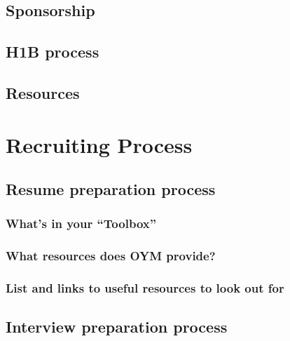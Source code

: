\documentclass[
]{book}
\begin{document}
\hypertarget{sponsorship}{%
\section{Sponsorship}\label{sponsorship}}

\hypertarget{h1b-process}{%
\section{H1B process}\label{h1b-process}}

\hypertarget{resources}{%
\section{Resources}\label{resources}}

\hypertarget{recruiting-process}{%
\chapter*{Recruiting Process}\label{recruiting-process}}

\hypertarget{resume-preparation-process}{%
\section{Resume preparation process}\label{resume-preparation-process}}

\hypertarget{whats-in-your-toolbox}{%
\subsection{What's in your ``Toolbox''}\label{whats-in-your-toolbox}}

\hypertarget{what-resources-does-oym-provide}{%
\subsection{What resources does OYM provide?}\label{what-resources-does-oym-provide}}

\hypertarget{list-and-links-to-useful-resources-to-look-out-for}{%
\subsection{List and links to useful resources to look out for}\label{list-and-links-to-useful-resources-to-look-out-for}}

\hypertarget{interview-preparation-process}{%
\section{Interview preparation process}\label{interview-preparation-process}}
\end{document}
